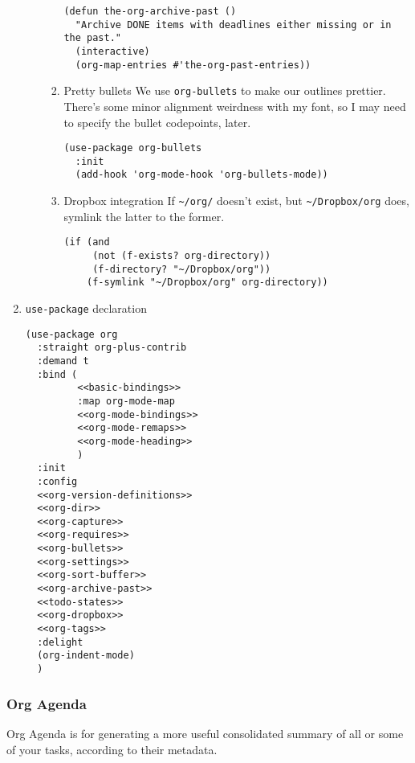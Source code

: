 \documentclass[11pt]{article}
\begin{document}
\begin{enumerate}
\begin{enumerate}
\begin{enumerate}
\begin{verbatim}
(defun the-org-archive-past ()
  "Archive DONE items with deadlines either missing or in the past."
  (interactive)
  (org-map-entries #'the-org-past-entries))
\end{verbatim}

\item Pretty bullets
\label{sec:orgd327f4e}
We use \texttt{org-bullets} to make our outlines prettier. There's some minor
alignment weirdness with my font, so I may need to specify the bullet
codepoints, later.
\begin{verbatim}
(use-package org-bullets
  :init
  (add-hook 'org-mode-hook 'org-bullets-mode))
\end{verbatim}

\item Dropbox integration
\label{sec:orgd9075fe}
If \texttt{\textasciitilde{}/org/} doesn't exist, but \texttt{\textasciitilde{}/Dropbox/org} does, symlink the
latter to the former.
\begin{verbatim}
(if (and
     (not (f-exists? org-directory))
     (f-directory? "~/Dropbox/org"))
    (f-symlink "~/Dropbox/org" org-directory))
\end{verbatim}
\end{enumerate}
\end{enumerate}
\item \texttt{use-package} declaration
\label{sec:orga968b37}

\begin{verbatim}
(use-package org
  :straight org-plus-contrib
  :demand t
  :bind (
         <<basic-bindings>>
         :map org-mode-map
         <<org-mode-bindings>>
         <<org-mode-remaps>>
         <<org-mode-heading>>
         )
  :init
  :config
  <<org-version-definitions>>
  <<org-dir>>
  <<org-capture>>
  <<org-requires>>
  <<org-bullets>>
  <<org-settings>>
  <<org-sort-buffer>>
  <<org-archive-past>>
  <<todo-states>>
  <<org-dropbox>>
  <<org-tags>>
  :delight
  (org-indent-mode)
  )
\end{verbatim}
\end{enumerate}

\subsubsection{Org Agenda}
\label{sec:org906c7a3}
Org Agenda is for generating a more useful consolidated summary of all
or some of your tasks, according to their metadata.
\end{document}
